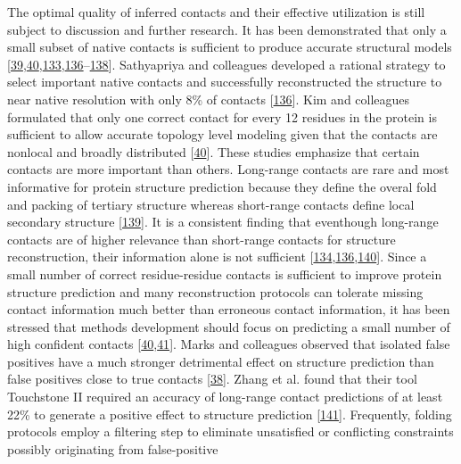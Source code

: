 \documentclass[11pt,a4paper,twoside]{book}
\theoremstyle{definition}
\theoremstyle{definition}
\theoremstyle{remark}
\begin{document}
The optimal quality of inferred contacts and their effective utilization
is still subject to discussion and further research. It has been
demonstrated that only a small subset of native contacts is sufficient
to produce accurate structural models
{[}\protect\hyperlink{ref-Vendruscolo1997}{39},\protect\hyperlink{ref-Kim2014}{40},\protect\hyperlink{ref-Konopka2014}{133},\protect\hyperlink{ref-Sathyapriya2009}{136}--\protect\hyperlink{ref-Vassura2007}{138}{]}.
Sathyapriya and colleagues developed a rational strategy to select
important native contacts and successfully reconstructed the structure
to near native resolution with only 8\% of contacts
{[}\protect\hyperlink{ref-Sathyapriya2009}{136}{]}. Kim and colleagues
formulated that only one correct contact for every 12 residues in the
protein is sufficient to allow accurate topology level modeling given
that the contacts are nonlocal and broadly distributed
{[}\protect\hyperlink{ref-Kim2014}{40}{]}. These studies emphasize that
certain contacts are more important than others. Long-range contacts are
rare and most informative for protein structure prediction because they
define the overal fold and packing of tertiary structure whereas
short-range contacts define local secondary structure
{[}\protect\hyperlink{ref-Adhikari2017}{139}{]}. It is a consistent
finding that eventhough long-range contacts are of higher relevance than
short-range contacts for structure reconstruction, their information
alone is not sufficient
{[}\protect\hyperlink{ref-Kosciolek2014}{134},\protect\hyperlink{ref-Sathyapriya2009}{136},\protect\hyperlink{ref-DiLena2009a}{140}{]}.
Since a small number of correct residue-residue contacts is sufficient
to improve protein structure prediction and many reconstruction
protocols can tolerate missing contact information much better than
erroneous contact information, it has been stressed that methods
development should focus on predicting a small number of high confident
contacts
{[}\protect\hyperlink{ref-Kim2014}{40},\protect\hyperlink{ref-Duarte2010}{41}{]}.
Marks and colleagues observed that isolated false positives have a much
stronger detrimental effect on structure prediction than false positives
close to true contacts {[}\protect\hyperlink{ref-Marks2011}{38}{]}.
Zhang et al. found that their tool Touchstone II required an accuracy of
long-range contact predictions of at least 22\% to generate a positive
effect to structure prediction
{[}\protect\hyperlink{ref-Zhang2003}{141}{]}. Frequently, folding
protocols employ a filtering step to eliminate unsatisfied or
conflicting constraints possibly originating from false-positive
\end{document}
